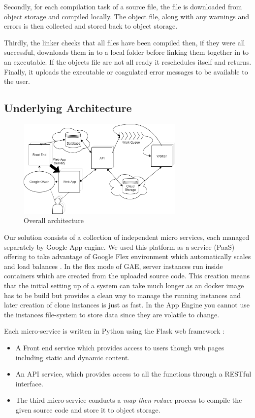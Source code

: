 \documentclass[conference]{IEEEtran}
\begin{document}
Secondly, for each compilation task of a source file, the file is downloaded
from object storage and compiled locally. The object file, along with any
warnings and errors is then collected and stored back to object storage.

Thirdly, the linker checks that all files have been compiled then, if they were
all successful, downloads them in to a local folder before linking them together
in to an executable. If the objects file are not all ready it reschedules
itself and returns. Finally, it uploads the executable or coagulated error
messages to be available to the user.

\subsection{Underlying Architecture}
\begin{figure}[ht] %
    \centering
    \includegraphics[width=3.2in]{OverallArchitecture.png}
    \caption{Overall architecture}
    \label{fig:underlying}
\end{figure}

Our solution consists of a collection of independent micro services, each managed separately by Google App engine. We used this platform-as-a-service (PaaS) offering to take advantage of Google Flex environment which automatically scales and load balances \cite{GAE}. In the flex mode of GAE, server instances run inside containers which are created from the uploaded source code. This creation means that the initial setting up of a system can take much longer as an docker image has to be build but provides a clean way to manage the running instances and later creation of clone instances is just as fast. In the App Engine you cannot use the instances file-system to store data since they are volatile to change.

Each micro-service is written in Python using the Flask web framework \cite{Flask}:

\begin{itemize}
\item A Front end service which provides access to users though web
pages including static and dynamic content.

\item An API service, which provides
access to all the functions through a RESTful interface.

\item The third micro-service conducts a \emph{map-then-reduce} process to
compile the given source code and store it to object storage.
\end{itemize}
\end{document}

